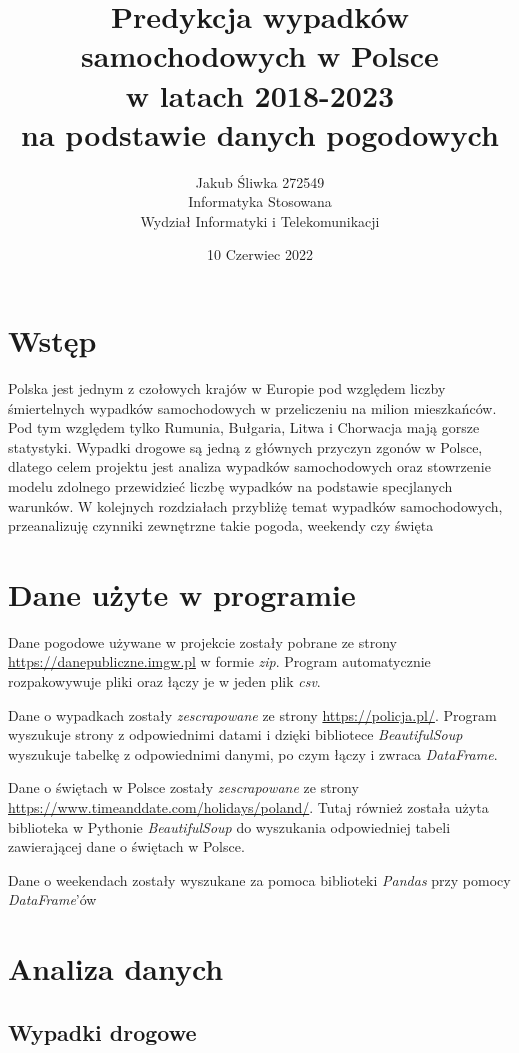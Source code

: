 \documentclass{article}
\title{Predykcja wypadków samochodowych w Polsce\\w latach 2018-2023\\na podstawie danych pogodowych}
\author{Jakub Śliwka 272549\\Informatyka Stosowana\\Wydział Informatyki i Telekomunikacji}
\date{10 Czerwiec 2022}
\begin{document}
\maketitle

\section{Wstęp}

Polska jest jednym z czołowych krajów w Europie pod względem liczby śmiertelnych wypadków samochodowych w przeliczeniu na milion mieszkańców.
Pod tym względem tylko Rumunia, Bułgaria, Litwa i Chorwacja mają gorsze statystyki.
Wypadki drogowe są jedną z głównych przyczyn zgonów w Polsce, dlatego celem projektu jest analiza wypadków samochodowych oraz stowrzenie modelu zdolnego przewidzieć liczbę wypadków na podstawie specjlanych warunków. 
W kolejnych rozdziałach przybliżę temat wypadków samochodowych, przeanalizuję czynniki zewnętrzne takie pogoda, weekendy czy święta



\section{Dane użyte w programie}

Dane pogodowe używane w projekcie zostały pobrane ze strony
\url{https://danepubliczne.imgw.pl} w formie \textit{zip}. Program automatycznie rozpakowywuje pliki oraz łączy je w jeden plik \textit{csv}.

Dane o wypadkach zostały \textit{zescrapowane} ze strony \url{https://policja.pl/}. Program wyszukuje strony z odpowiednimi datami i dzięki bibliotece \textit{BeautifulSoup} wyszukuje tabelkę z odpowiednimi danymi, po czym łączy i zwraca \textit{DataFrame}. 

Dane o świętach w Polsce zostały \textit{zescrapowane} ze strony \url{https://www.timeanddate.com/holidays/poland/}. Tutaj również została użyta biblioteka w Pythonie \textit{BeautifulSoup} do wyszukania odpowiedniej tabeli zawierającej dane o świętach w Polsce.

Dane o weekendach zostały wyszukane za pomoca biblioteki \textit{Pandas} przy pomocy \textit{DataFrame}'ów

\section{Analiza danych}
\subsection{Wypadki drogowe}
\end{document}
